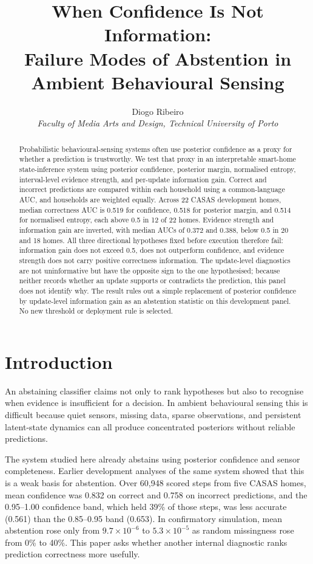 \documentclass[11pt]{article}
\title{When Confidence Is Not Information:\\Failure Modes of Abstention in Ambient Behavioural Sensing}
\author{Diogo Ribeiro\\\small\textit{Faculty of Media Arts and Design, Technical University of Porto}}
\date{}
\renewcommand{\_}{\textunderscore\allowbreak}
\begin{document}
\maketitle

\begin{abstract}
Probabilistic behavioural-sensing systems often use posterior confidence as a proxy for whether a prediction is trustworthy. We test that proxy in an interpretable smart-home state-inference system using posterior confidence, posterior margin, normalised entropy, interval-level evidence strength, and per-update information gain. Correct and incorrect predictions are compared within each household using a common-language AUC, and households are weighted equally. Across 22 CASAS development homes, median correctness AUC is 0.519 for confidence, 0.518 for posterior margin, and 0.514 for normalised entropy, each above 0.5 in 12 of 22 homes. Evidence strength and information gain are inverted, with median AUCs of 0.372 and 0.388, below 0.5 in 20 and 18 homes. All three directional hypotheses fixed before execution therefore fail: information gain does not exceed 0.5, does not outperform confidence, and evidence strength does not carry positive correctness information. The update-level diagnostics are not uninformative but have the opposite sign to the one hypothesised; because neither records whether an update supports or contradicts the prediction, this panel does not identify why. The result rules out a simple replacement of posterior confidence by update-level information gain as an abstention statistic on this development panel. No new threshold or deployment rule is selected.
\end{abstract}

\section{Introduction}
An abstaining classifier claims not only to rank hypotheses but also to recognise when evidence is insufficient for a decision. In ambient behavioural sensing this is difficult because quiet sensors, missing data, sparse observations, and persistent latent-state dynamics can all produce concentrated posteriors without reliable predictions.

The system studied here already abstains using posterior confidence and sensor completeness. Earlier development analyses of the same system \citep{ribeiro2026toolkit} showed that this is a weak basis for abstention. Over 60,948 scored steps from five CASAS homes, mean confidence was 0.832 on correct and 0.758 on incorrect predictions, and the 0.95--1.00 confidence band, which held 39\% of those steps, was less accurate (0.561) than the 0.85--0.95 band (0.653). In confirmatory simulation, mean abstention rose only from $9.7\times10^{-6}$ to $5.3\times10^{-5}$ as random missingness rose from 0\% to 40\%. This paper asks whether another internal diagnostic ranks prediction correctness more usefully.
\end{document}
